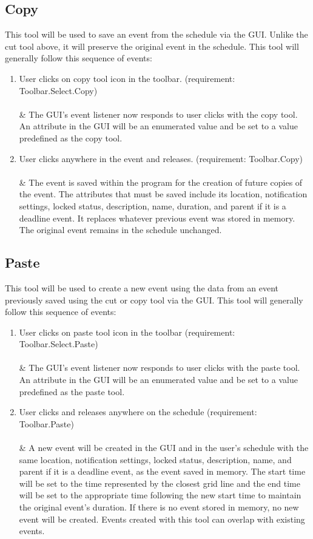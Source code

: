 \documentclass{scrreprt}
\begin{document}
\subsection{Copy}
This tool will be used to save an event from the schedule via the GUI. Unlike the cut tool above, it will preserve the original event in the schedule. This tool will generally follow this sequence of events:
\begin{enumerate}
    \item User clicks on copy tool icon in the toolbar. (requirement: Toolbar.Select.Copy)\\
    \\ & The GUI's event listener now responds to user clicks with the copy tool. An attribute in the GUI will be an enumerated value and be set to a value predefined as the copy tool.
    \item User clicks anywhere in the event and releases. (requirement: Toolbar.Copy)\\
    \\ & The event is saved within the program for the creation of future copies of the event. The attributes that must be saved include its location, notification settings, locked status, description, name, duration, and parent if it is a deadline event. It replaces whatever previous event was stored in memory. The original event remains in the schedule unchanged.
\end{enumerate}

\subsection{Paste}
This tool will be used to create a new event using the data from an event previously saved using the cut or copy tool via the GUI. This tool will generally follow this sequence of events:
\begin{enumerate}
    \item User clicks on paste tool icon in the toolbar (requirement: Toolbar.Select.Paste)\\
    \\ & The GUI's event listener now responds to user clicks with the paste tool. An attribute in the GUI will be an enumerated value and be set to a value predefined as the paste tool.
    \item User clicks and releases anywhere on the schedule (requirement: Toolbar.Paste)\\
    \\ & A new event will be created in the GUI and in the user's schedule with the same location, notification settings, locked status, description, name, and parent if it is a deadline event, as the event saved in memory. The start time will be set to the time represented by the closest grid line and the end time will be set to the appropriate time following the new start time to maintain the original event's duration. If there is no event stored in memory, no new event will be created. Events created with this tool can overlap with existing events.
\end{enumerate}
\end{document}
